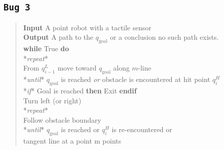 \hypertarget{bug-3}{%
\subsection{\texorpdfstring{\texttt{Bug\ 3}}{Bug 3}}\label{bug-3}}

\begin{quote}
\textbf{Input} A point robot with a tactile sensor\\
\textbf{Output} A path to the \(q_{\text{goal}}\) or a conclusion no
such path exists.\\
\textbf{while} True \textbf{do}\\
\hspace*{0.333em}\hspace*{0.333em}*\emph{repeat}*\\
\hspace*{0.333em}\hspace*{0.333em}\hspace*{0.333em}\hspace*{0.333em}From
\(q^L_{i-1}\) move toward \(q_{\text{goal}}\) along \(m\)-line\\
\hspace*{0.333em}\hspace*{0.333em}*\emph{until}* \(q_{\text{goal}}\) is
reached \emph{or} obstacle is encountered at hit point \(q^H_{i}\)\\
\hspace*{0.333em}\hspace*{0.333em}*\emph{if}* Goal is reached
\textbf{then} Exit \textbf{endif}\\
\hspace*{0.333em}\hspace*{0.333em}Turn left (or right)\\
\hspace*{0.333em}\hspace*{0.333em}*\emph{repeat}*\\
\hspace*{0.333em}\hspace*{0.333em}\hspace*{0.333em}\hspace*{0.333em}Follow
obstacle boundary\\
\hspace*{0.333em}\hspace*{0.333em}*\emph{until}* \(q_{\text{goal}}\) is
reached or \(q^H_{i}\) is re-encountered or\\
\hspace*{0.333em}\hspace*{0.333em}tangent line at a point m points

\end{quote}
